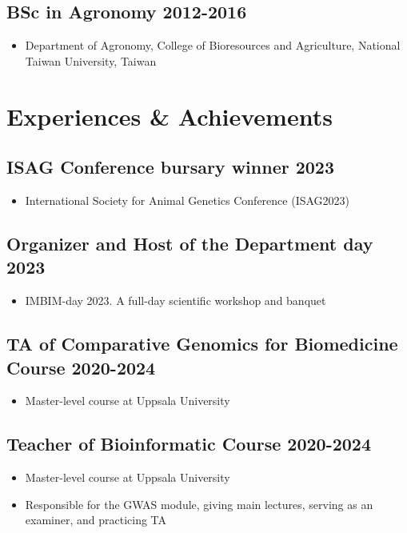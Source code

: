 \documentclass[10pt]{article}
\begin{document}
\subsection*{BSc in Agronomy \hfill 2012-2016}
\begin{itemize}
\item Department of Agronomy, College of Bioresources and Agriculture, National Taiwan University, Taiwan
\end{itemize}



\section*{Experiences \& Achievements}

\subsection*{ISAG Conference bursary winner \hfill 2023}
\begin{itemize}
\item International Society for Animal Genetics Conference (ISAG2023)
\end{itemize}

\subsection*{Organizer and Host of the Department day \hfill 2023}
\begin{itemize}
\item IMBIM-day 2023. A full-day scientific workshop and banquet
\end{itemize}

\subsection*{TA of Comparative Genomics for Biomedicine Course \hfill 2020-2024}
\begin{itemize}
\item Master-level course at Uppsala University
\end{itemize}

\subsection*{Teacher of Bioinformatic Course \hfill 2020-2024}
\begin{itemize}
\item Master-level course at Uppsala University
\item Responsible for the GWAS module, giving main lectures, serving as an examiner, and practicing TA
\end{itemize}
\end{document}
